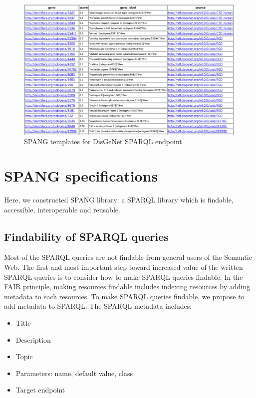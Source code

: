 \documentclass[runningheads]{llncs}
\begin{document}
\begin{figure}
\center
\includegraphics[width=1.0\textwidth]{spang_disease_gene_result.png}
\caption{SPANG templates for DisGeNet SPARQL endpoint}
\label{fig:spang_disease_gene_result}
\end{figure}


\section{SPANG specifications}

Here, we constructed SPANG library: a SPARQL library which is findable, accessible, interoperable and reusable.

\subsection{Findability of SPARQL queries}
Most of the SPARQL queries are not findable from general users of the Semantic Web. The first and most important step toward increased value of the written SPARQL queries is to consider how to make SPARQL queries findable.
In the FAIR principle, making resources findable includes indexing resources by adding metadata to each resources. 
To make SPARQL queries findable, we propose to add metadata to SPARQL.
The SPARQL metadata includes:
\begin{itemize}
    \item Title
    \item Description
    \item Topic
    \item Parameters: name, default value, class
    \item Target endpoint
\end{itemize}
\end{document}
